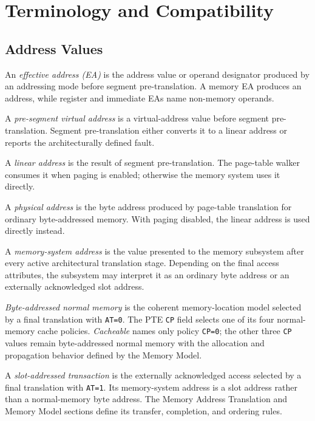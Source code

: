 \clearpage
\section{Terminology and Compatibility}\label{page:terminology-and-compatibility}\label{section:terminology}

\subsection{Address Values}\label{section:address-terminology}

An \emph{effective address (EA)} is the address value or operand designator produced by an addressing mode before
segment pre-translation. A memory EA produces an address, while register and immediate EAs name non-memory operands.

A \emph{pre-segment virtual address} is a virtual-address value before segment pre-translation. Segment
pre-translation either converts it to a linear address or reports the architecturally defined fault.

A \emph{linear address} is the result of segment pre-translation. The page-table walker consumes it when paging is
enabled; otherwise the memory system uses it directly.

A \emph{physical address} is the byte address produced by page-table translation for ordinary byte-addressed memory.
With paging disabled, the linear address is used directly instead.

A \emph{memory-system address} is the value presented to the memory subsystem after every active architectural
translation stage. Depending on the final access attributes, the subsystem may interpret it as an ordinary byte
address or an externally acknowledged slot address.

\emph{Byte-addressed normal memory} is the coherent memory-location model selected by a final translation with
\texttt{AT=0}. The PTE \texttt{CP} field selects one of its four normal-memory cache policies. \emph{Cacheable}
names only policy \texttt{CP=0}; the other three \texttt{CP} values remain byte-addressed normal memory with the
allocation and propagation behavior defined by the Memory Model.

A \emph{slot-addressed transaction} is the externally acknowledged access selected by a final translation with
\texttt{AT=1}. Its memory-system address is a slot address rather than a normal-memory byte address. The
Memory Address Translation and Memory Model sections define its transfer, completion, and ordering rules.

